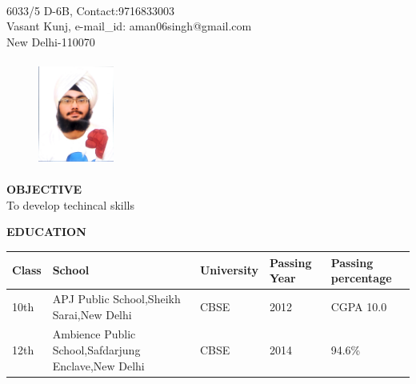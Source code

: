 \documentclass{article}
\begin{document}
\\
\vspace{0.5in}


\begin{flushleft}
6033/5 D-6B, \hfill{Contact:9716833003}\\
Vasant Kunj, \hfill{e-mail\_id: aman06singh@gmail.com}\\
New Delhi-110070\\
\end{flushleft}



\begin{figure}[h]
\begin{flushright}	
\includegraphics[width=2.5cm, height=3.5cm]{pic.jpg}	
\end{flushright}
\end{figure}



\begin{flushleft}
\textbf{OBJECTIVE }\\
\vskip  0.2cm
\hspace{0.2in}
To develop techincal skills
\end{flushleft}



\begin{flushleft}
\vspace{0.3in}
\textbf{EDUCATION }
\begin{center}
\begin{tabular}{| L{2cm} | C{4cm} | C{2cm} | C{2cm} | R{2cm}| }
\hline
Class & School & University & Passing Year & Passing percentage\\ 
\hline
10th & APJ Public School,Sheikh Sarai,New Delhi & CBSE & 2012 & CGPA 10.0\\
\hline
12th & Ambience Public School,Safdarjung Enclave,New Delhi & CBSE & 2014 & 94.6\% \\
\hline
\end{tabular}
\end{center}
\end{flushleft}
\end{document}
